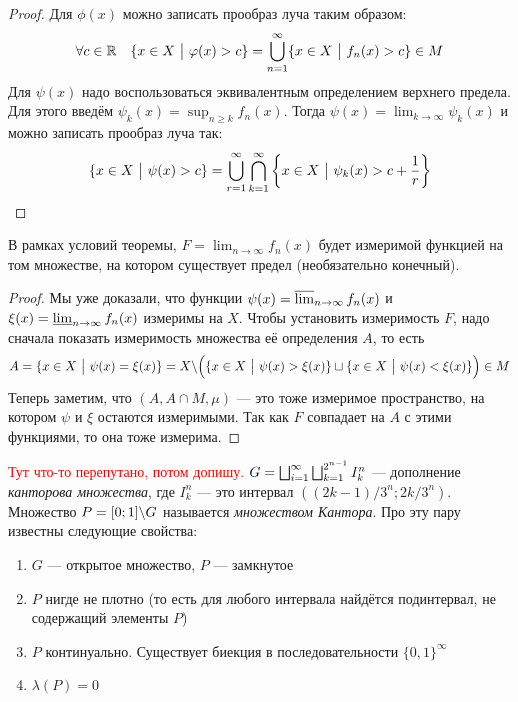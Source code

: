 \begin{proof}
	Для $\phi(x)$ можно записать прообраз луча таким образом:
	\[
		\forall c \in \mathbb{R} \quad \{x \in X \ \big|\  \varphi(x) > c\} = \bigcup_{n = 1}^\infty \{x \in X \ \big|\  f_n(x) > c\} \in M
	\]
	Для $\psi(x)$ надо воспользоваться эквивалентным определением верхнего предела. Для этого введём $\psi_k(x) = \sup_{n \ge k} f_n(x)$. Тогда $\psi(x) = \lim_{k \to \infty} \psi_k(x)$ и можно записать прообраз луча так:
	\[
		\{x \in X \ \big|\  \psi(x) > c\} = \bigcup_{r = 1}^\infty \bigcap_{k = 1}^\infty \left\{x \in X \ \big|\  \psi_k(x) > c + \frac{1}{r}\right\}
	\]
\end{proof}

\begin{corollary}
	В рамках условий теоремы, $F = \lim_{n \to \infty} f_n(x)$ будет измеримой функцией на том множестве, на котором существует предел (необязательно конечный).
\end{corollary}

\begin{proof}
	Мы уже доказали, что функции $\psi(x) = \varlimsup_{n \to \infty} f_n(x)$ и $\xi(x) = \varliminf_{n \to \infty} f_n(x)$ измеримы на $X$. Чтобы установить измеримость $F$, надо сначала показать измеримость множества её определения $A$, то есть
	\[
		A = \{x \in X \ \big|\  \psi(x) = \xi(x)\} = X \backslash \Big(\{x \in X \ \big|\  \psi(x) > \xi(x)\} \sqcup \{x \in X \ \big|\  \psi(x) < \xi(x)\}\Big) \in M
	\]
	Теперь заметим, что $(A, A \cap M, \mu)$ --- это тоже измеримое пространство, на котором $\psi$ и $\xi$ остаются измеримыми. Так как $F$ совпадает на $A$ с этими функциями, то она тоже измерима.
\end{proof}

\begin{reminder}
	\textcolor{red}{Тут что-то перепутано, потом допишу.}
	$G = \bigsqcup_{i = 1}^\infty \bigsqcup_{k = 1}^{2^{n - 1}} I_k^n$ --- дополнение \textit{канторова множества}, где $I_k^n$ --- это интервал $((2k - 1) / 3^n; 2k / 3^n)$. Множество $P = [0; 1] \backslash G$ называется \textit{множеством Кантора}. Про эту пару известны следующие свойства:
	\begin{enumerate}
		\item $G$ --- открытое множество, $P$ --- замкнутое
		
		\item $P$ нигде не плотно (то есть для любого интервала найдётся подинтервал, не содержащий элементы $P$)
		
		\item $P$ континуально. Существует биекция в последовательности $\{0, 1\}^\infty$
		
		\item $\lambda(P) = 0$
	\end{enumerate}
\end{reminder}